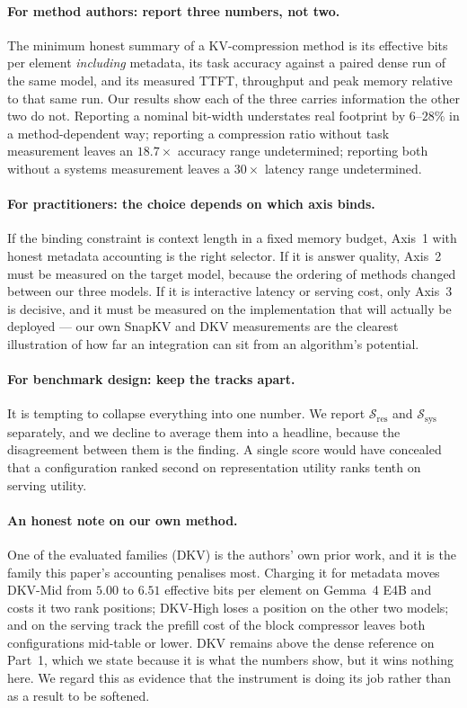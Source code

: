 \documentclass{article}
\theoremstyle{definition}
\newcommand{\Sres}{\mathcal{S}_{\text{res}}}
\newcommand{\Ssys}{\mathcal{S}_{\text{sys}}}
\begin{document}
\paragraph{For method authors: report three numbers, not two.} The minimum honest summary of a KV-compression method is its effective bits per element \emph{including} metadata, its task accuracy against a paired dense run of the same model, and its measured TTFT, throughput and peak memory relative to that same run. Our results show each of the three carries information the other two do not. Reporting a nominal bit-width understates real footprint by $6$--$28\%$ in a method-dependent way; reporting a compression ratio without task measurement leaves an $18.7\times$ accuracy range undetermined; reporting both without a systems measurement leaves a $30\times$ latency range undetermined.

\paragraph{For practitioners: the choice depends on which axis binds.} If the binding constraint is context length in a fixed memory budget, Axis~1 with honest metadata accounting is the right selector. If it is answer quality, Axis~2 must be measured on the target model, because the ordering of methods changed between our three models. If it is interactive latency or serving cost, only Axis~3 is decisive, and it must be measured on the implementation that will actually be deployed --- our own SnapKV and DKV measurements are the clearest illustration of how far an integration can sit from an algorithm's potential.

\paragraph{For benchmark design: keep the tracks apart.} It is tempting to collapse everything into one number. We report $\Sres$ and $\Ssys$ separately, and we decline to average them into a headline, because the disagreement between them is the finding. A single score would have concealed that a configuration ranked second on representation utility ranks tenth on serving utility.

\paragraph{An honest note on our own method.} One of the evaluated families (DKV) is the authors' own prior work, and it is the family this paper's accounting penalises most. Charging it for metadata moves DKV-Mid from $5.00$ to $6.51$ effective bits per element on Gemma~4 E4B and costs it two rank positions; DKV-High loses a position on the other two models; and on the serving track the prefill cost of the block compressor leaves both configurations mid-table or lower. DKV remains above the dense reference on Part~1, which we state because it is what the numbers show, but it wins nothing here. We regard this as evidence that the instrument is doing its job rather than as a result to be softened.
\end{document}
